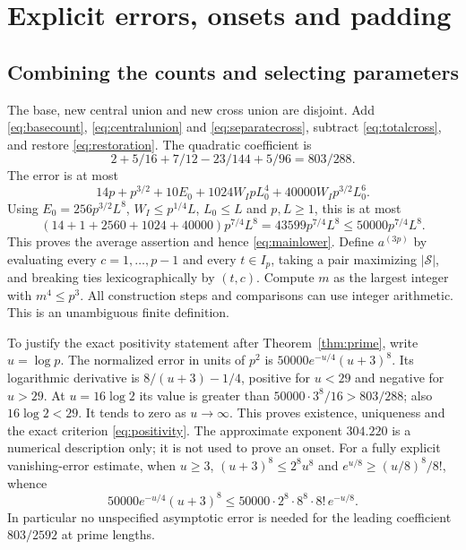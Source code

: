 \documentclass[10pt]{amsart}
\theoremstyle{remark}
\newcommand{\Sset}{\mathcal S}
\begin{document}
\section{Explicit errors, onsets and padding}\label{sec:onsets}
\subsection{Combining the counts and selecting parameters}
The base, new central union and new cross union are disjoint.
Add \eqref{eq:basecount}, \eqref{eq:centralunion} and
\eqref{eq:separatecross}, subtract \eqref{eq:totalcross}, and restore
\eqref{eq:restoration}. The quadratic coefficient is
\[
 2+5/16+7/12-23/144+5/96=803/288.
\]
The error is at most
\[
 14p+p^{3/2}+10E_0+1024W_IpL_0^4+40000W_Ip^{3/2}L_0^6.
\]
Using $E_0=256p^{3/2}L^8$, $W_I\le p^{1/4}L$, $L_0\le L$ and
$p,L\ge1$, this is at most
\begin{equation}\label{eq:totalerror}
 (14+1+2560+1024+40000)p^{7/4}L^8
 =43599p^{7/4}L^8\le50000p^{7/4}L^8.
\end{equation}
This proves the average assertion and hence \eqref{eq:mainlower}.
Define $a^{(3p)}$ by evaluating every $c=1,\ldots,p-1$ and every
$t\in I_p$, taking a pair maximizing $|\Sset|$, and breaking ties
lexicographically by $(t,c)$. Compute $m$ as the largest integer with
$m^4\le p^3$. All construction steps and comparisons can use integer
arithmetic. This is an unambiguous finite definition.

To justify the exact positivity statement after Theorem~\ref{thm:prime},
write $u=\log p$. The normalized error in units of $p^2$ is
$50000e^{-u/4}(u+3)^8$. Its logarithmic derivative is
$8/(u+3)-1/4$, positive for $u<29$ and negative for $u>29$.
At $u=16\log2$ its value is greater than $50000\cdot3^8/16>803/288$;
also $16\log2<29$. It tends to zero as $u\to\infty$.
This proves existence, uniqueness and the exact criterion
\eqref{eq:positivity}. The approximate exponent $304.220$ is a
numerical description only; it is not used to prove an onset.
For a fully explicit vanishing-error estimate, when $u\ge3$,
$(u+3)^8\le2^8u^8$ and $e^{u/8}\ge(u/8)^8/8!$, whence
\[
 50000e^{-u/4}(u+3)^8
 \le50000\cdot2^8\cdot8^8\cdot8!\,e^{-u/8}.
\]
In particular no unspecified asymptotic error is needed for the
leading coefficient $803/2592$ at prime lengths.
\end{document}
